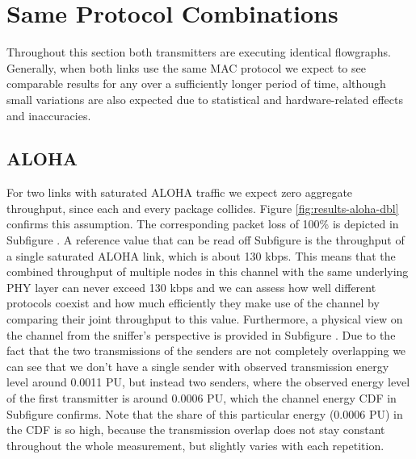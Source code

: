 \section{Same Protocol Combinations}

Throughout this section both transmitters are executing identical flowgraphs. Generally, when both links use the same MAC protocol we expect to see comparable results for any over a sufficiently longer period of time, although small variations are also expected due to statistical and hardware-related effects and inaccuracies. 

\subsection{ALOHA}
\label{sec:dbl-aloha}

For two links with saturated ALOHA traffic we expect zero aggregate throughput, since each and every package collides. Figure \ref{fig:results-aloha-dbl}  confirms this assumption. The corresponding packet loss of 100\% is depicted in Subfigure . A reference value that can be read off Subfigure  is the throughput of a single saturated ALOHA link, which is about 130 kbps. This means that the combined throughput of multiple nodes in this channel with the same underlying PHY layer can never exceed 130 kbps and we can assess how well different protocols coexist and how much efficiently they make use of the channel by comparing their joint throughput to this value. Furthermore, a physical view on the channel from the sniffer's perspective is provided in Subfigure . Due to the fact that the two transmissions of the senders are not completely overlapping we can see that we don't have a single sender with observed transmission energy level around 0.0011 PU, but instead two senders, where the observed energy level of the first transmitter is around 0.0006 PU, which the channel energy CDF in Subfigure  confirms. Note that the share of this particular energy (0.0006 PU) in the CDF is so high, because the transmission overlap does not stay constant throughout the whole measurement, but slightly varies with each repetition.
